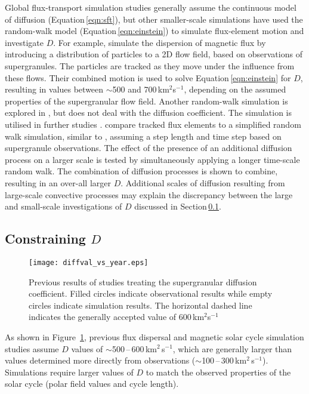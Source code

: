 Global flux-transport simulation studies generally assume the continuous model of diffusion (Equation\,\ref{eqn:sft}), but other smaller-scale simulations have used the random-walk model (Equation\,\ref{eqn:einstein}) to simulate flux-element motion and investigate $D$. For example, \cite{Simon:1995} simulate the dispersion of magnetic flux by introducing a distribution of particles to a 2D flow field, based on observations of supergranules. The particles are tracked as they move under the influence from these flows. Their combined motion is used to solve Equation\,\ref{eqn:einstein} for $D$, resulting in values between $\sim$500 and 700\,km$^2$s$^{-1}$, depending on the assumed properties of the supergranular flow field.
Another random-walk simulation is explored in \cite{Schrijver:1997b}, but does not deal with the diffusion coefficient. The simulation is utilised in further studies \citep{Schrijver:2001,Schrijver:2003,Schrijver:2008b}.
\cite{Hagenaar:1999} compare tracked flux elements to a simplified random walk simulation, similar to \cite{Simon:1995},  assuming a step length and time step based on supergranule observations. The effect of the presence of an additional diffusion process on a larger scale is tested by simultaneously applying a longer time-scale random walk. The combination of diffusion processes is shown to combine, resulting in an over-all larger $D$. Additional scales of diffusion resulting from large-scale convective processes may explain the discrepancy between the large and small-scale investigations of $D$ discussed in Section\,\ref{sect:constraind}.


\subsection{Constraining $D$}\label{sect:constraind}

 \begin{figure}[!t]    %
   \centerline{\texttt{[image: diffval\_vs\_year.eps]}
              }
              \caption[Previous supergranular diffusion study results.]{Previous results of studies treating the supergranular diffusion coefficient. Filled circles indicate observational results while empty circles indicate simulation results. The horizontal dashed line indicates the generally accepted value of 600\,km$^2$s$^{-1}$}
   \label{fig:prevdiffcoeff}
   \end{figure}

As shown in Figure~\ref{fig:prevdiffcoeff}, previous flux dispersal and magnetic solar cycle simulation studies assume $D$ values of $\sim$500\,--\,600\,km$^2$\,s$^{-1}$, which are generally larger than  values determined more directly from observations ($\sim$100\,--\,300\,km$^2$\,s$^{-1}$). Simulations require larger values of $D$ to match the observed properties of the solar cycle (polar field values and cycle length). 

